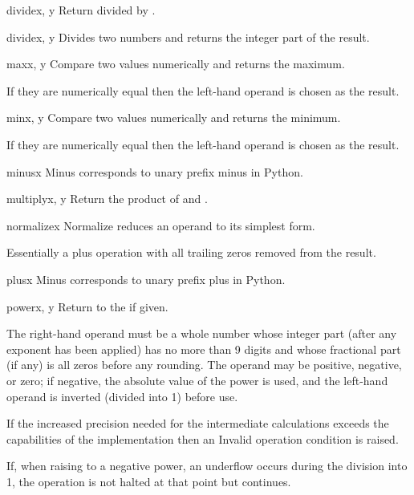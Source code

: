 \begin{methoddesc}{divide}{x, y}
  Return  divided by .
\end{methoddesc}   
  
\begin{methoddesc}{divide}{x, y}
  Divides two numbers and returns the integer part of the result.
\end{methoddesc} 

\begin{methoddesc}{max}{x, y}
  Compare two values numerically and returns the maximum.

  If they are numerically equal then the left-hand operand is chosen as the
  result.
\end{methoddesc} 
 
\begin{methoddesc}{min}{x, y}
  Compare two values numerically and returns the minimum.

  If they are numerically equal then the left-hand operand is chosen as the
  result.
\end{methoddesc}

\begin{methoddesc}{minus}{x}
  Minus corresponds to unary prefix minus in Python.
\end{methoddesc}

\begin{methoddesc}{multiply}{x, y}
  Return the product of  and .
\end{methoddesc}

\begin{methoddesc}{normalize}{x}
  Normalize reduces an operand to its simplest form.

  Essentially a plus operation with all trailing zeros removed from the
  result.
\end{methoddesc}
  
\begin{methoddesc}{plus}{x}
  Minus corresponds to unary prefix plus in Python.
\end{methoddesc}

\begin{methoddesc}{power}{x, y}
  Return  to the  if given.

  The right-hand operand must be a whole number whose integer part (after any
  exponent has been applied) has no more than 9 digits and whose fractional
  part (if any) is all zeros before any rounding. The operand may be positive,
  negative, or zero; if negative, the absolute value of the power is used, and
  the left-hand operand is inverted (divided into 1) before use.

  If the increased precision needed for the intermediate calculations exceeds
  the capabilities of the implementation then an Invalid operation condition
  is raised.

  If, when raising to a negative power, an underflow occurs during the
  division into 1, the operation is not halted at that point but continues. 
\end{methoddesc}

